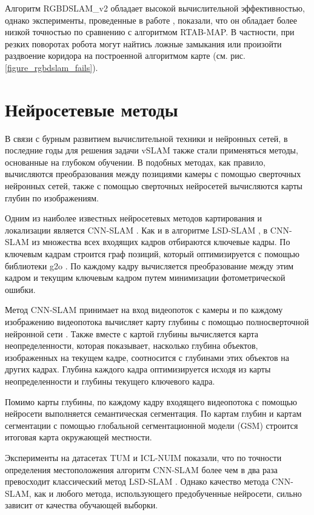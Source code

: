 \documentclass{mipt-thesis-ms}
\begin{document}
	Алгоритм RGBDSLAM\_v2 обладает высокой вычислительной эффективностью, однако эксперименты, проведенные в работе \cite{bokovoy2020map}, показали, что он обладает более низкой точностью по сравнению с алгоритмом RTAB-MAP. В частности, при резких поворотах робота могут найтись ложные замыкания или произойти раздвоение коридора на построенной алгоритмом карте (см. рис. \ref{figure_rgbdslam_fails}).
	
	\section{Нейросетевые методы}
	
	В связи с бурным развитием вычислительной техники и нейронных сетей, в последние годы для решения задачи vSLAM также стали применяться методы, основанные на глубоком обучении. В подобных методах, как правило, вычисляются преобразования между позициями камеры с помощью сверточных нейронных сетей, также с помощью сверточных нейросетей вычисляются карты глубин по изображениям.
	
	Одним из наиболее известных нейросетевых методов картирования и локализации является CNN-SLAM \cite{tateno2017cnn}.	Как и в алгоритме LSD-SLAM \cite{engel2014lsd}, в CNN-SLAM из множества всех входящих кадров отбираются ключевые кадры. По ключевым кадрам строится граф позиций, который оптимизируется с помощью библиотеки g2o \cite{grisetti2011g2o}. По каждому кадру вычисляется преобразование между этим кадром и текущим ключевым кадром путем минимизации фотометрической ошибки.
	
	Метод CNN-SLAM принимает на вход видеопоток с камеры и по каждому изображению видеопотока вычисляет карту глубины с помощью полносверточной нейронной сети \cite{laina2016deeper}. Также вместе с картой глубины вычисляется карта неопределенности, которая показывает, насколько глубина объектов, изображенных на текущем кадре, соотносится с глубинами этих объектов на других кадрах. Глубина каждого кадра оптимизируется исходя из карты неопределенности и глубины текущего ключевого кадра.
	 
	Помимо карты глубины, по каждому кадру входящего видеопотока с помощью нейросети выполняется семантическая сегментация. По картам глубин и картам сегментации с помощью глобальной сегментационной модели (GSM) \cite{tateno2015real} строится итоговая карта окружающей местности.
	
	Эксперименты на датасетах TUM \cite{sturm2012benchmark} и ICL-NUIM \cite{handa2014benchmark} показали, что по точности определения местоположения алгоритм CNN-SLAM более чем в два раза превосходит классический метод LSD-SLAM \cite{engel2014lsd}. Однако качество метода CNN-SLAM, как и любого метода, использующего предобученные нейросети, сильно зависит от качества обучающей выборки.
	
\end{document}
